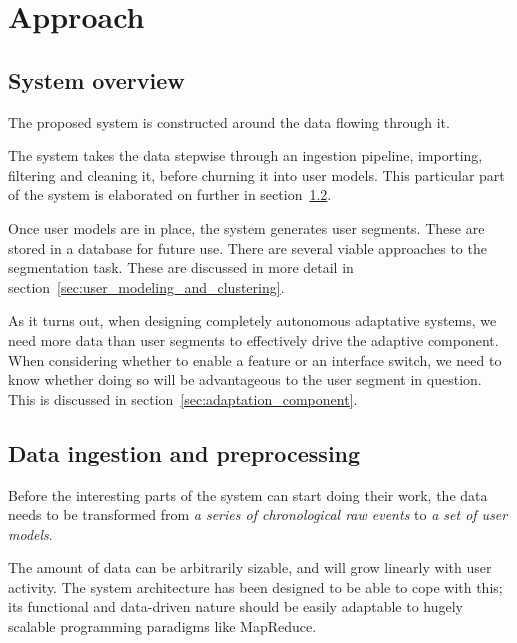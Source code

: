 \chapter{Approach}

\label{Chapter3}


\section{System overview} %
\label{sec:system_overview}

The proposed system is constructed around the data flowing through it.

The system takes the data stepwise through an ingestion pipeline, importing, filtering and cleaning it, before churning it into user models. This particular part of the system is elaborated on further in section~\ref{sec:data_ingestion_and_preprocessing}.

Once user models are in place, the system generates user segments. These are stored in a database for future use. There are several viable approaches to the segmentation task. These are discussed in more detail in section~\ref{sec:user_modeling_and_clustering}.

As it turns out, when designing completely autonomous adaptative systems, we need more data than user segments to effectively drive the adaptive component. When considering whether to enable a feature or an interface switch, we need to know whether doing so will be advantageous to the user segment in question. This is discussed in section~\ref{sec:adaptation_component}.


\section{Data ingestion and preprocessing} %
\label{sec:data_ingestion_and_preprocessing}

Before the interesting parts of the system can start doing their work, the data needs to be transformed from \emph{a series of chronological raw events} to \emph{a set of user models}.

The amount of data can be arbitrarily sizable, and will grow linearly with user activity. The system architecture has been designed to be able to cope with this; its functional and data-driven nature should be easily adaptable to hugely scalable programming paradigms like MapReduce.

